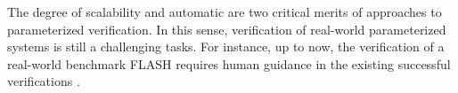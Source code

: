 \documentclass[final]{IEEEtran}
\begin{document}
The degree of scalability and automatic are two critical merits of approaches to parameterized verification. In this sense, verification of real-world parameterized systems is still a challenging tasks.
For instance, up to now, the verification of a real-world benchmark FLASH requires human guidance in the existing successful verifications \cite{Park1996a,McMillan2001,Chou2004}. %
\end{document}
